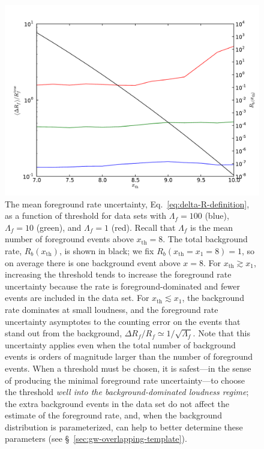 \documentclass[aps,prd,reprint,nofootinbib]{revtex4-1}
\begin{document}
\begin{figure}
  \includegraphics[width=\columnwidth]{threshold.pdf}
  \caption{\label{fig:threshold-rate-dependence} The mean foreground
    rate uncertainty, Eq.~\eqref{eq:delta-R-definition}, as a function
    of threshold for data sets with $\Lambda_f = 100$ (blue),
    $\Lambda_f = 10$ (green), and $\Lambda_f = 1$ (red).  Recall that
    $\Lambda_f$ is the mean number of foreground events above
    $x_\mathrm{th} = 8$.  The total background rate, $R_b\left(
    x_\mathrm{th} \right)$, is shown in black; we fix $R_b \left(
    x_\mathrm{th} = x_1 = 8\right) = 1$, so on average there is one
    background event above $x = 8$.  For $x_\mathrm{th} \gtrsim x_1$,
    increasing the threshold tends to increase the foreground rate
    uncertainty because the rate is foreground-dominated and fewer
    events are included in the data set.  For $x_\mathrm{th} \lesssim
    x_1$, the background rate dominates at small loudness, and the
    foreground rate uncertainty asymptotes to the counting error on
    the events that stand out from the background, $\Delta R_f / R_f
    \simeq 1/\sqrt{\Lambda_f}$.  Note that this uncertainty applies
    even when the total number of background events is orders of
    magnitude larger than the number of foreground events.  When a
    threshold must be chosen, it is safest---in the sense of producing
    the minimal foreground rate uncertainty---to choose the threshold
    \emph{well into the background-dominated loudness regime}; the
    extra background events in the data set do not affect the estimate
    of the foreground rate, and, when the background distribution is
    parameterized, can help to better determine these parameters (see
    \S~\ref{sec:gw-overlapping-template}). }
\end{figure}
\end{document}
